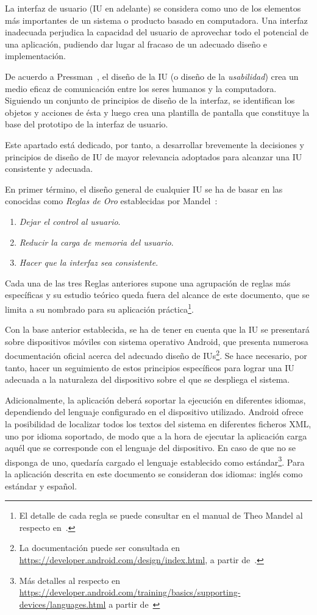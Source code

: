 La interfaz de usuario (IU en adelante) se considera como uno de los elementos más importantes de un sistema o producto basado en computadora. Una interfaz inadecuada perjudica la capacidad del usuario de aprovechar todo el potencial de una aplicación, pudiendo dar lugar al fracaso de un adecuado diseño e implementación.

De acuerdo a Pressman~\cite{Pre10}, el diseño de la IU (o diseño de la \emph{usabilidad}) crea un medio eficaz de comunicación entre los seres humanos y la computadora. Siguiendo un conjunto de principios de diseño de la interfaz, se identifican los objetos y acciones de ésta y luego crea una plantilla de pantalla que constituye la base del prototipo de la interfaz de usuario.

Este apartado está dedicado, por tanto, a desarrollar brevemente la decisiones y principios de diseño de IU de mayor relevancia adoptados para alcanzar una IU consistente y adecuada.

En primer término, el diseño general de cualquier IU se ha de basar en las conocidas como \emph{Reglas de Oro} establecidas por Mandel~\cite{Man97}:

\begin{enumerate}
	\item{\textit{Dejar el control al usuario}}.
	\item{\textit{Reducir la carga de memoria del usuario}}.
	\item{\textit{Hacer que la interfaz sea consistente}}.
\end{enumerate}

Cada una de las tres Reglas anteriores supone una agrupación de reglas más específicas y su estudio teórico queda fuera del alcance de este documento, que se limita a su nombrado para su aplicación práctica\footnote{El detalle de cada regla se puede consultar en el manual de Theo Mandel al respecto en~\cite{Man97}.}.

Con la base anterior establecida, se ha de tener en cuenta que la IU se presentará sobre dispositivos móviles con sistema operativo Android, que presenta numerosa documentación oficial acerca del adecuado diseño de IUs\footnote{La documentación puede ser consultada en \url{https://developer.android.com/design/index.html}, a partir de~\cite{AnDev}.}. Se hace necesario, por tanto, hacer un seguimiento de estos principios específicos para lograr una IU adecuada a la naturaleza del dispositivo sobre el que se despliega el sistema.

Adicionalmente, la aplicación deberá soportar la ejecución en diferentes idiomas, dependiendo del lenguaje configurado en el dispositivo utilizado. Android ofrece la posibilidad de localizar todos los textos del sistema en diferentes ficheros XML, uno por idioma soportado, de modo que a la hora de ejecutar la aplicación carga aquél que se corresponde con el lenguaje del dispositivo. En caso de que no se disponga de uno, quedaría cargado el lenguaje establecido como estándar\footnote{Más detalles al respecto en \url{https://developer.android.com/training/basics/supporting-devices/languages.html} a partir de~\cite{AnDev}}. Para la aplicación descrita en este documento se consideran dos idiomas: inglés como estándar y español.

